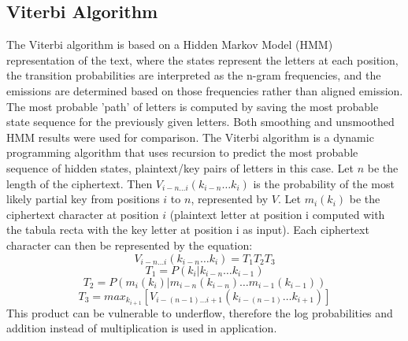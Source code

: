 \documentclass[11pt,letterpaper]{article}
\begin{document}
\subsection{Viterbi Algorithm}
The Viterbi algorithm is based on a Hidden Markov Model (HMM) representation of the text, where the states represent the letters at each position, the transition probabilities are interpreted as the n-gram frequencies, and the emissions are determined based on those frequencies rather than aligned emission. The most probable 'path' of letters is computed by saving the most probable state sequence for the previously given letters. Both smoothing and unsmoothed HMM results were used for comparison.
The Viterbi algorithm is a dynamic programming algorithm that uses recursion to predict the most probable sequence of hidden states, plaintext/key pairs of letters in this case. Let $n$ be the length of the ciphertext. Then $V_{i-n \dots i}(k_{i-n}\dots k_i)$ is the probability of the most likely partial key from positions $i$ to $n$, represented by $V$. Let $m_i(k_i)$ be the ciphertext character at position $i$ (plaintext letter at position i computed with the tabula recta with the key letter at position i as input). Each ciphertext character can then be represented by the equation:
$$V_{i-n \dots i}(k_{i-n}\dots k_i) = T_1 T_2 T_3 $$
$$T_1 = P(k_i | k_{i-n}\dots k_{i-1}) $$
$$T_2 = P(m_i(k_i) | m_{i-n}(k_{i-n}) \dots m_{i-1}(k_{i-1})) $$
$$T_3 = max_{k_{i+1}}[V_{i-(n-1) \dots i+1}(k_{i-(n-1)}\dots k_{i+1})]$$
This product can be vulnerable to underflow, therefore the log probabilities and addition instead of multiplication is used in application.
\end{document}
